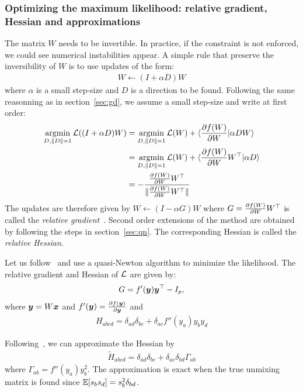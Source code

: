 \subsubsection{Optimizing the maximum likelihood: relative gradient, Hessian and approximations}
\label{sec:opt:likelihood:relativegradient}
The matrix $W$ needs to be invertible. In practice, if the constraint is not
enforced, we could see numerical instabilities appear.
A simple rule that preserve the inversibility of $W$ is to use updates of the
form:
\begin{align}
  W \leftarrow (I + \alpha D)W \label{eq:mult:update}
\end{align}
where $\alpha$ is a small step-size and $D$ is a direction to be found.
Following the same reasonning as in section~\ref{sec:gd}, we assume a small step-size
and write at first order:
\begin{align}
  \argmin_{D, \|D\|=1} \loss((I + \alpha D)W) &= \argmin_{D, \|D\|=1} \loss(W) + \langle \partialfrac{W}{f(W)} | \alpha D W \rangle \\
                                              &= \argmin_{D, \|D\|=1} \loss(W) + \langle \partialfrac{W}{f(W)} W^{\top} | \alpha D \rangle \\
                                              &= -\frac{\partialfrac{W}{f(W)} W^{\top}}{\|\partialfrac{W}{f(W)} W^{\top} \|}
\end{align}
The updates are therefore given by  $W \leftarrow (I - \alpha G)W$ where $G = \partialfrac{W}{f(W)}
  W^{\top}$ is called the \emph{relative
  gradient}~\cite{cardoso1996equivariant}.
Second order extensions of the method are obtained by following the steps in
section~\ref{sec:qn}. The corresponding Hessian is called the \emph{relative
  Hessian}.


Let us follow~\cite{ablin2018faster} and use a quasi-Newton algorithm to minimize the likelihood.
The relative gradient and Hessian of $\loss$ are given by:
\begin{align}
  G = f'(\yb) \yb^{\top} - I_p,
\end{align}
where $\yb = W \xb$ and $f'(\yb) = \partialfrac{\yb}{f(\yb)}$ 
and
\begin{align}
  H_{abcd} =  \delta_{ad}\delta_{bc} + \delta_{ac} f''(y_a)y_by_d
\end{align}

Following~\cite{ablin2018faster}, we can approximate the Hessian by
\begin{align}
  \tilde{H}_{abcd} = \delta_{ad} \delta_{bc} + \delta_{ac} \delta_{bd} \Gamma_{ab}
\end{align}
where $\Gamma_{ab} = f''(y_a) y_b^2$.
The approximation is exact when the true unmixing matrix is found since $\EE[s_b s_d] =  s_b^2\delta_{bd}$.

